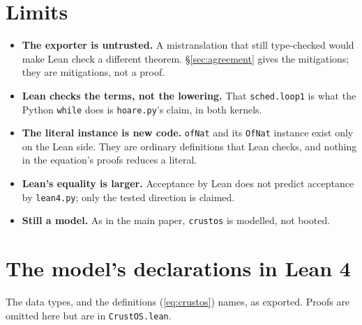 \documentclass[11pt]{article}
\newcommand{\code}[1]{\texttt{#1}}
\begin{document}
\section{Limits}
\label{sec:limits}
\small
\begin{itemize}
\item \textbf{The exporter is untrusted.} A mistranslation that still
  type-checked would make Lean check a different theorem.
  \S\ref{sec:agreement} gives the mitigations; they are mitigations, not a
  proof.
\item \textbf{Lean checks the terms, not the lowering.} That
  \code{sched.loop1} is what the Python \code{while} does is
  \code{hoare.py}'s claim, in both kernels.
\item \textbf{The literal instance is new code.} \code{ofNat} and its
  \code{OfNat} instance exist only on the Lean side. They are ordinary
  definitions that Lean checks, and nothing in the equation's proofs reduces
  a literal.
\item \textbf{Lean's equality is larger.} Acceptance by Lean does not predict
  acceptance by \code{lean4.py}; only the tested direction is claimed.
\item \textbf{Still a model.} As in the main paper, \code{crustos} is modelled,
  not booted.
\end{itemize}

\appendix
\section{The model's declarations in Lean 4}
\label{sec:appendix}

The data types, and the definitions (\ref{eq:crustos}) names, as exported.
Proofs are omitted here but are in \code{CrustOS.lean}.
\end{document}
